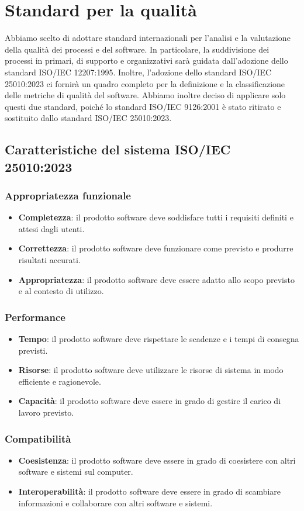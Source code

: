 \section{Standard per la qualità}
Abbiamo scelto di adottare standard internazionali per l'analisi e la valutazione della qualità dei processi e del software. In particolare, la suddivisione dei processi in primari, di supporto e organizzativi sarà guidata dall'adozione dello standard ISO/IEC 12207:1995. Inoltre, l'adozione dello standard ISO/IEC 25010:2023 ci fornirà un quadro completo per la definizione e la classificazione delle metriche di qualità del software. Abbiamo inoltre deciso di applicare solo questi due standard, poiché lo standard ISO/IEC 9126:2001 è stato ritirato e sostituito dallo standard ISO/IEC 25010:2023.
\subsection{Caratteristiche del sistema ISO/IEC 25010:2023}
\subsubsection{Appropriatezza funzionale}
\begin{itemize}
    \item \textbf{Completezza}: il prodotto software deve soddisfare tutti i requisiti definiti e attesi dagli utenti.
    \item \textbf{Correttezza}: il prodotto software deve funzionare come previsto e produrre risultati accurati.
    \item \textbf{Appropriatezza}: il prodotto software deve essere adatto allo scopo previsto e al contesto di utilizzo.
\end{itemize}
\subsubsection{Performance}
\begin{itemize}
    \item \textbf{Tempo}: il prodotto software deve rispettare le scadenze e i tempi di consegna previsti.
    \item \textbf{Risorse}: il prodotto software deve utilizzare le risorse di sistema in modo efficiente e ragionevole.
    \item \textbf{Capacità}: il prodotto software deve essere in grado di gestire il carico di lavoro previsto.
\end{itemize}
\subsubsection{Compatibilità}
\begin{itemize}
    \item \textbf{Coesistenza}: il prodotto software deve essere in grado di coesistere con altri software e sistemi sul computer.
    \item \textbf{Interoperabilità}: il prodotto software deve essere in grado di scambiare informazioni e collaborare con altri software e sistemi.
\end{itemize}
